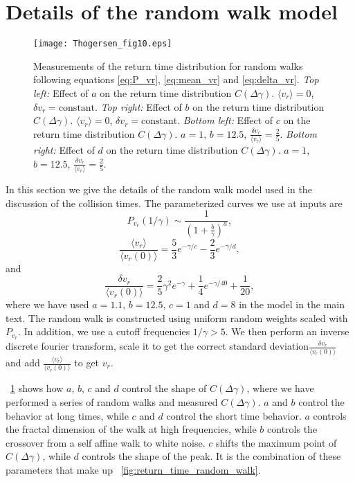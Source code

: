 \documentclass[aps,pre,twocolumn,letterpaper,floatfix,showpacs]{revtex4}
\begin{document}
\section{Details of the random walk model} \label{appendix:random_walk}
\begin{figure}
\texttt{[image: Thogersen\_fig10.eps]}
\caption{
Measurements of the return time distribution for random walks following equations \ref{eq:P_vr}, \ref{eq:mean_vr} and \ref{eq:delta_vr}.
\emph{Top left:} Effect of $a$ on the return time distribution $C(\Delta \gamma)$. $\langle v_r \rangle = 0$, $\delta v_r = \text{constant}$.
\emph{Top right:} Effect of $b$ on the return time distribution $C(\Delta \gamma)$. $\langle v_r \rangle = 0$, $\delta v_r = \text{constant}$.
\emph{Bottom left:} Effect of $c$ on the return time distribution $C(\Delta \gamma)$. $a = 1$, $b = 12.5$, $\frac{\delta v_r}{\langle v_r \rangle}= \frac{2}{5}$.
\emph{Bottom right:} Effect of $d$ on the return time distribution $C(\Delta \gamma)$. $a = 1$, $b = 12.5$, $\frac{\delta v_r}{\langle v_r \rangle} = \frac{2}{5}$.
\label{fig:random_walk_param_study}}
\end{figure}
In this section we give the details of the random walk model used in the discussion of the collision times. The parameterized curves we use at inputs are 
\begin{equation}
P_{v_r}(1/ \gamma) \sim \frac{1}{(1+\frac{b}{\gamma})^{a}},
\label{eq:P_vr}
\end{equation}
\begin{equation}
\frac{\langle v_r \rangle}{\langle v_r(0) \rangle} = \frac{5}{3}e^{-\gamma/c} -\frac{2}{3}e^{-\gamma/d},
\label{eq:mean_vr}
\end{equation}
and
\begin{equation}
\frac{\delta v_r}{\langle v_r(0) \rangle} = \frac{2}{5}\gamma^2 e^{-\gamma} + \frac{1}{4}e^{-\gamma/40} + \frac{1}{20},
\label{eq:delta_vr}
\end{equation}
where we have used $a = 1.1$, $b = 12.5$, $c = 1$ and $d = 8$ in the model in the main text. The random walk is constructed using uniform random weights scaled with $P_{v_r}$. In addition, we use a cutoff frequencies $1/\gamma > 5$. We then perform an inverse discrete fourier transform, scale it to get the correct standard deviation$\frac{\delta v_r}{\langle v_r(0) \rangle}$ and add $\frac{\langle v_r \rangle}{\langle v_r(0) \rangle}$ to get $v_r$.

\figurename~\ref{fig:random_walk_param_study} shows how $a$, $b$, $c$ and $d$ control the shape of $C(\Delta \gamma)$, where we have performed a series of random walks and measured $C(\Delta \gamma)$. $a$ and $b$ control the behavior at long times, while $c$ and $d$ control the short time behavior. $a$ controls the fractal dimension of the walk at high frequencies, while $b$ controls the crossover from a self affine walk to white noise. $c$ shifts the maximum point of $C(\Delta \gamma)$, while $d$ controls the shape of the peak. It is the combination of these parameters that make up \figurename~\ref{fig:return_time_random_walk}.


\end{document}
